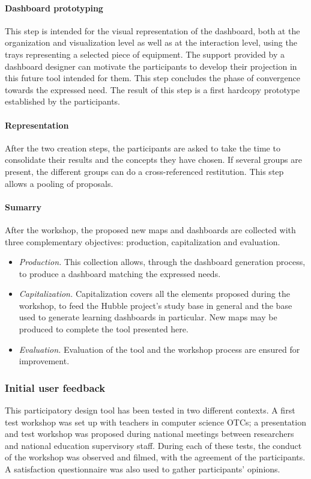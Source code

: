 \documentclass[preprint,12pt]{elsarticle}
\begin{document}
\paragraph{Dashboard prototyping}
This step is intended for the visual representation of the dashboard, both at the organization and visualization level as well as at the interaction level, using the trays representing a selected piece of equipment. The support provided by a dashboard designer can motivate the participants to develop their projection in this future tool intended for them. This step concludes the phase of convergence towards the expressed need. The result of this step is a first hardcopy prototype established by the participants.

\paragraph{Representation}
After the two creation steps, the participants are asked to take the time to consolidate their results and the concepts they have chosen. If several groups are present, the different groups can do a cross-referenced restitution. This step allows a pooling of proposals.

\paragraph{Sumarry}
After the workshop, the proposed new maps and dashboards are collected with three complementary objectives: production, capitalization and evaluation.
\begin{itemize}
    \item \textit{Production.} This collection allows, through the dashboard generation process, to produce a dashboard matching the expressed needs.
    \item \textit{Capitalization.} Capitalization covers all the elements proposed during the workshop, to feed the Hubble project's study base in general and the base used to generate learning dashboards in particular. New maps may be produced to complete the tool presented here.
    \item \textit{Evaluation.} Evaluation of the tool and the workshop process are ensured for improvement.
\end{itemize}


\subsubsection{Initial user feedback}
This participatory design tool has been tested in two different contexts. A first test workshop was set up with teachers in computer science OTCs; a presentation and test workshop was proposed during national meetings between researchers and national education supervisory staff. During each of these tests, the conduct of the workshop was observed and filmed, with the agreement of the participants. A satisfaction questionnaire was also used to gather participants' opinions.
\end{document}
